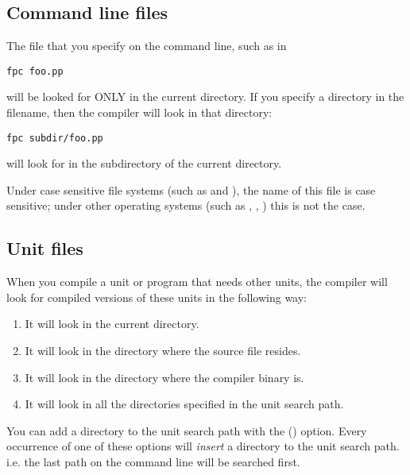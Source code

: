 \subsection{Command line files}
The file that you specify on the command line, such as in
\begin{verbatim}
fpc foo.pp
\end{verbatim}
will be looked for ONLY in the current directory. If you specify a directory
in the filename, then the compiler will look in that directory:
\begin{verbatim}
fpc subdir/foo.pp
\end{verbatim}
will look for  in the subdirectory  of the current
directory.

Under case sensitive file systems (such as \linux and \unix), the name of this 
file is case sensitive; under other operating systems (such as \dos, \windowsnt, \ostwo) 
this is not the case.

\subsection{Unit files}
\label{se:unitsearching}

When you compile a unit or program that needs other units, the compiler will
look for compiled versions of these units in the following way:
\begin{enumerate}
\item It will look in the current directory.
\item It will look in the directory where the source file resides.
\item It will look in the directory where the compiler binary is.
\item It will look in all the directories specified in the unit search path.
\end{enumerate}

You can add a directory to the unit search path with the ()
option. Every occurrence of one of these options will {\em insert}
a directory to the unit search path. i.e. the last path on the command line
will be searched first.

